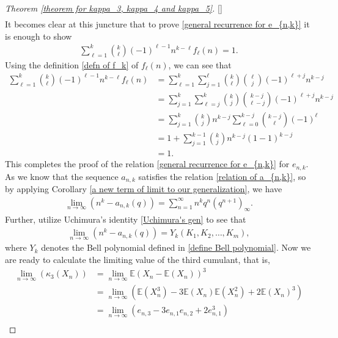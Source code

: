 \documentclass[11pt,reqno]{amsart}
\renewcommand{\(}{\left\(}
\renewcommand{\)}{\right\)}
\renewcommand{\[}{\left\[}
\renewcommand{\]}{\right\]}
\numberwithin{equation}{section}
\theoremstyle{plain}
\begin{document}
\begin{proof}[Theorem \ref{theorem for kappa_3, kappa_4 and kappa_5}][]
\begin{align*}
\end{align*}
It becomes clear at this juncture that  to prove \eqref{general recurrence for e_{n,k}} it is enough to show  
\begin{align*}
\sum_{\ell= 1}^k {k \choose \ell} (-1)^{\ell -1} n^{k - \ell}  f_{\ell}(n) =1.  
\end{align*}
Using the definition \eqref{defn of f_k} of $f_\ell(n)$,  we can see that 
\begin{align*}
\sum_{\ell= 1}^k {k \choose \ell} (-1)^{\ell -1} n^{k - \ell}  f_{\ell}(n) & = \sum_{\ell= 1}^k  \sum_{j=1}^\ell  {k \choose \ell}  {\ell \choose j}  (-1)^{\ell+j} n^{k - j}  \\ 
& = \sum_{j=1}^k \sum_{\ell=j}^k {k \choose j} {k-j \choose \ell-j} (-1)^{\ell+j} n^{k - j}  \\
&=  \sum_{j=1}^k {k \choose j}  n^{k-j}  \sum_{\ell=0}^{k-j} {k-j \choose \ell} (-1)^\ell \\
&= 1 + \sum_{j=1}^{k-1} {k \choose j}  n^{k-j} (1-1)^{k-j} \\
&=1.
\end{align*}
This completes the proof of the relation \eqref{general recurrence for e_{n,k}} for $e_{n,k}$.  
As we know that the sequence $a_{n,k}$ satisfies the relation \eqref{relation of a_{n,k}}, so by applying Corollary \ref{a new term of limit to our generalization},  we have 
\begin{align*}
\lim_{n\rightarrow \infty}\left(n^k- a_{n,k}(q)\right) = \sum_{n=1}^\infty n^k q^n(q^{n+1})_\infty.
\end{align*}
Further,  utilize Uchimura's identity \eqref{Uchimura's gen} 
to see that 
\begin{align}\label{Limit form of Bell polynomials}
\lim_{n\rightarrow \infty}\left(n^k- a_{n,k}(q)\right) =  Y_k(K_1,K_2,\dots,K_m),
\end{align}
where $Y_k$ denotes the Bell polynomial defined in \eqref{define Bell polynomial}.  
Now  we are ready to calculate the limiting value of the third cumulant,  that is,  
\begin{align*}
 \lim_{n\rightarrow \infty}\left(\kappa_3(X_n)\right) & = \lim_{n\rightarrow \infty}\mathbb{E}(X_n-\mathbb{E}(X_n))^3 \nonumber \\
&=\lim_{n\rightarrow \infty} \left( \mathbb{E}(X_n^3) -3\mathbb{E}(X_n)\mathbb{E}(X_n^2) + 2\mathbb{E}(X_n)^3 \right) \nonumber \\
&=\lim_{n\rightarrow \infty} \left( e_{n,3} -3e_{n,1}e_{n,2} + 2e_{n,1}^3 \right) \nonumber \\

\end{align*}
\end{proof}
\end{document}
